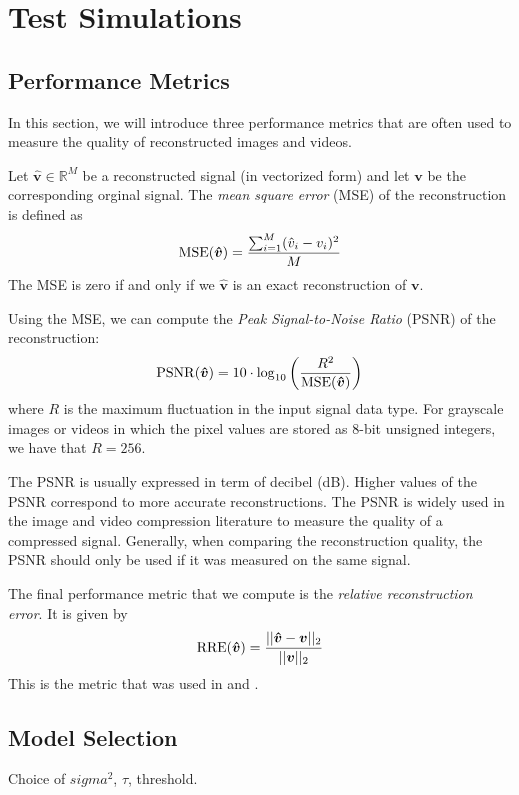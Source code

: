 \chapter{Test Simulations}
\label{ch:results}

\section{Performance Metrics}
In this section, we will introduce three performance metrics that are often used to measure the quality of reconstructed images and videos.

Let $\bm \hat{v} \in\mathbb{R}^M$ be a reconstructed signal (in vectorized form) and let $\bm v$ be the corresponding orginal signal.
The \emph{mean square error} (MSE) of the reconstruction is defined as
\begin{equation*}
  \operatorname*{MSE}(\bm{\hat v}) = \frac{\sum_{i=1}^M (\hat v_i - v_i)^2}{M}
\end{equation*}
The MSE is zero if and only if we $\bm{\hat v}$ is an exact reconstruction of $\bm v$.

Using the MSE, we can compute the \emph{Peak Signal-to-Noise Ratio} (PSNR) of the reconstruction:
\begin{equation*}
  \operatorname*{PSNR}(\bm{\hat v}) = 10 \cdot \log_{10} \left(\frac{R^2}{\operatorname*{MSE}(\bm{\hat v})}\right)
\end{equation*}
where $R$ is the maximum fluctuation in the input signal data type. 
For grayscale images or videos in which the pixel values are stored as 8-bit unsigned integers, we have that $R = 256$.

The PSNR is usually expressed in term of decibel (dB). 
Higher values of the PSNR correspond to more accurate reconstructions.
The PSNR is widely used in the image and video compression literature to measure the quality of a compressed signal.
Generally, when comparing the reconstruction quality, the PSNR should only be used if it was measured on the same signal.

The final performance metric that we compute is the \emph{relative reconstruction error}.
It is given by
\begin{equation*}
  \operatorname*{RRE}(\bm{\hat v}) = \frac{||\bm{\hat v} - \bm v||_2}{||\bm v||_2}
\end{equation*}
This is the metric that was used in \cite{ji2008} and \cite{pilikos2014}.

\section{Model Selection}
Choice of $sigma^2$, $\tau$, threshold.

